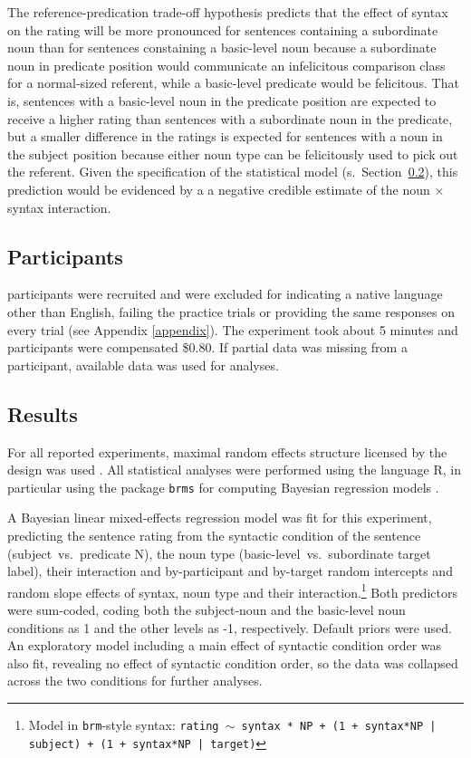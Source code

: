 The reference-predication trade-off hypothesis predicts that the effect of syntax on the rating will be more pronounced for sentences containing a subordinate noun than for sentences constaining a basic-level noun because a subordinate noun in predicate position would communicate an infelicitous comparison class for a normal-sized referent, while a basic-level predicate would be felicitous. That is, sentences with a basic-level noun in the predicate position are expected to receive a higher rating than sentences with a subordinate noun in the predicate, but a smaller difference in the ratings is expected for sentences with a noun in the subject position because either noun type can be felicitously used to pick out the referent. Given the specification of the statistical model (s.~Section~\ref{rating-results-section}), this prediction would be evidenced by a a negative credible estimate of the noun $\times$ syntax interaction.   

\subsection{Participants}
 participants were recruited and  were excluded for indicating a native language other than English, failing the practice trials or providing the same responses on every trial (see Appendix \ref{appendix}). The experiment took about 5 minutes and participants were compensated \$0.80. If partial data was missing from a participant, available data was used for analyses. 
\subsection{Results}
\label{rating-results-section}
For all reported experiments, maximal random effects structure licensed by the design was used \parencite{barr2013}. All statistical analyses were performed using the language R, in particular using the package \texttt{brms} for computing Bayesian regression models \parencite{Rteam2013, burkner2017advanced}.

A Bayesian linear mixed-effects regression model was fit for this experiment, predicting the sentence rating from the syntactic condition of the sentence (subject~vs.~predicate N), the noun type (basic-level~vs.~subordinate target label), their interaction and by-participant and by-target random intercepts and random slope effects of syntax, noun type and their interaction.\footnote{Model in \texttt{brm}-style syntax: \texttt{rating $\sim$ syntax * NP + (1 + syntax*NP | subject) + (1 + syntax*NP | target)}} 
Both predictors were sum-coded, coding both the subject-noun and the basic-level noun conditions as 1 and the other levels as -1, respectively. Default priors were used.
An exploratory model including a main effect of syntactic condition order was also fit, revealing no effect of syntactic condition order, so the data was collapsed across the two conditions for further analyses. 


